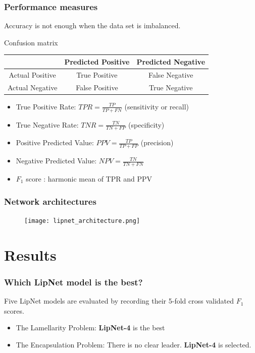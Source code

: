 \documentclass{beamer}
\begin{document}
%
%

\begin{frame}
\frametitle{Performance measures}

\begin{block}{}
Accuracy is not enough when the data set is imbalanced.
\end{block}

\begin{block}{Confusion matrix}
\begin{table}
\begin{tabular}{|c|c|c|}
\hline 
 & Predicted Positive & Predicted Negative \\ 
\hline 
Actual Positive & True Positive & False Negative \\ 
\hline 
Actual Negative & False Positive & True Negative \\ 
\hline 
\end{tabular} 
\end{table}
\end{block}

\begin{itemize}
\item True Positive Rate: $TPR = \frac{TP}{TP + FN}$ (sensitivity or recall)
\item True Negative Rate: $TNR = \frac{TN}{TN + FP}$ (specificity)
\item Positive Predicted Value: $PPV = \frac{TP}{TP + FP}$ (precision)
\item Negative Predicted Value: $NPV = \frac{TN}{TN + FN}$
\item $F_1$ score : harmonic mean of TPR and PPV
\end{itemize}
\end{frame}

%
%

\begin{frame}
\frametitle{Network architectures}

\begin{figure}
\centering
\texttt{[image: lipnet\_architecture.png]} 
\end{figure}

\end{frame}

\section{Results}
\begin{frame}
\frametitle{Which LipNet model is the best?}
Five LipNet models are evaluated by recording their 5-fold cross validated $F_1$ scores. 
\vskip 0.2in
\begin{itemize}
\item<2-> The Lamellarity Problem: \textbf{LipNet-4} is the best
\item<3-> The Encapsulation Problem: There is no clear leader. \textbf{LipNet-4} is selected. 
\end{itemize}
\end{frame}
\end{document}
